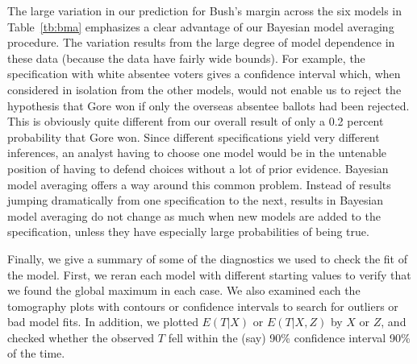 \documentclass[11pt,titlepage]{article}
\begin{document}
The large variation in our prediction for Bush's margin across the six
models in Table~\ref{tb:bma} emphasizes a clear advantage of our
Bayesian model averaging procedure.  The variation results from the
large degree of model dependence in these data (because the data have
fairly wide bounds).  For example, the specification with white
absentee voters gives a confidence interval which, when considered in
isolation from the other models, would not enable us to reject the
hypothesis that Gore won if only the overseas absentee ballots had
been rejected.  This is obviously quite different from our overall
result of only a 0.2 percent probability that Gore won.  Since
different specifications yield very different inferences, an analyst
having to choose one model would be in the untenable position of
having to defend choices without a lot of prior evidence.  Bayesian
model averaging offers a way around this common problem.  Instead of
results jumping dramatically from one specification to the next,
results in Bayesian model averaging do not change as much when new
models are added to the specification, unless they have especially
large probabilities of being true.

Finally, we give a summary of some of the diagnostics we used to check
the fit of the model.  First, we reran each model with different
starting values to verify that we found the global maximum in each
case.  We also examined each the tomography plots with contours or
confidence intervals to search for outliers or bad model fits.  In
addition, we plotted $E(T|X)$ or $E(T|X,Z)$ by $X$ or $Z$, and checked
whether the observed $T$ fell within the (say) 90\% confidence
interval 90\% of the time.
\end{document}
